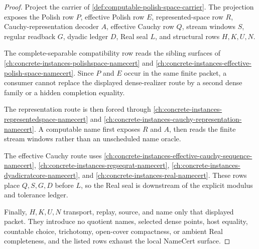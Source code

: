 \begin{proof}
Project the carrier of \autoref{def:computable-polish-space-carrier}. The projection exposes the Polish row $P$, effective Polish row $E$, represented-space row $R$, Cauchy-representation decoder $A$, effective Cauchy row $Q$, stream windows $S$, regular readback $G$, dyadic ledger $D$, Real seal $L$, and structural rows $H,K,U,N$.

The complete-separable compatibility row reads the sibling surfaces of \autoref{ch:concrete-instances-polishspace-namecert} and \autoref{ch:concrete-instances-effective-polish-space-namecert}. Since $P$ and $E$ occur in the same finite packet, a consumer cannot replace the displayed dense-realizer route by a second dense family or a hidden completion equality.

The representation route is then forced through \autoref{ch:concrete-instances-representedspace-namecert} and \autoref{ch:concrete-instances-cauchy-representation-namecert}. A computable name first exposes $R$ and $A$, then reads the finite stream windows rather than an unscheduled name oracle.

The effective Cauchy route uses \autoref{ch:concrete-instances-effective-cauchy-sequence-namecert}, \autoref{ch:concrete-instances-regseqrat-namecert}, \autoref{ch:concrete-instances-dyadicratcore-namecert}, and \autoref{ch:concrete-instances-real-namecert}. These rows place $Q,S,G,D$ before $L$, so the Real seal is downstream of the explicit modulus and tolerance ledger.

Finally, $H,K,U,N$ transport, replay, source, and name only that displayed packet. They introduce no quotient names, selected dense points, host equality, countable choice, trichotomy, open-cover compactness, or ambient Real completeness, and the listed rows exhaust the local NameCert surface.
\end{proof}

